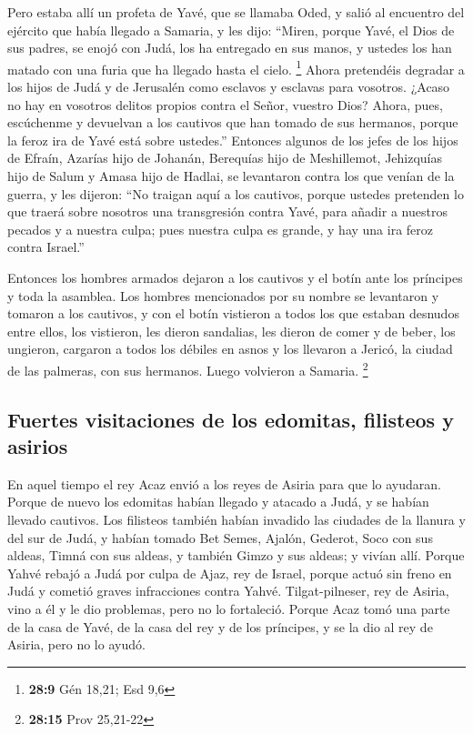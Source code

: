 \begin{paracol}{2}
 Pero estaba allí un profeta de Yavé, que se llamaba Oded,
y salió al encuentro del ejército que había llegado a Samaria, y les
dijo: ``Miren, porque Yavé, el Dios de sus padres, se enojó con Judá,
los ha entregado en sus manos, y ustedes los han matado con una furia
que ha llegado hasta el cielo. \footnote{\textbf{28:9} Gén 18,21; Esd
  9,6}  Ahora pretendéis degradar a los hijos de Judá y
de Jerusalén como esclavos y esclavas para vosotros. ¿Acaso no hay en
vosotros delitos propios contra el Señor, vuestro Dios? 
Ahora, pues, escúchenme y devuelvan a los cautivos que han tomado de sus
hermanos, porque la feroz ira de Yavé está sobre ustedes.''
 Entonces algunos de los jefes de los hijos de Efraín,
Azarías hijo de Johanán, Berequías hijo de Meshillemot, Jehizquías hijo
de Salum y Amasa hijo de Hadlai, se levantaron contra los que venían de
la guerra,  y les dijeron: ``No traigan aquí a los
cautivos, porque ustedes pretenden lo que traerá sobre nosotros una
transgresión contra Yavé, para añadir a nuestros pecados y a nuestra
culpa; pues nuestra culpa es grande, y hay una ira feroz contra
Israel.''

 Entonces los hombres armados dejaron a los cautivos y el
botín ante los príncipes y toda la asamblea.  Los hombres
mencionados por su nombre se levantaron y tomaron a los cautivos, y con
el botín vistieron a todos los que estaban desnudos entre ellos, los
vistieron, les dieron sandalias, les dieron de comer y de beber, los
ungieron, cargaron a todos los débiles en asnos y los llevaron a Jericó,
la ciudad de las palmeras, con sus hermanos. Luego volvieron a Samaria.
\footnote{\textbf{28:15} Prov 25,21-22}

\hypertarget{fuertes-visitaciones-de-los-edomitas-filisteos-y-asirios}{%
\subsection{Fuertes visitaciones de los edomitas, filisteos y
asirios}\label{fuertes-visitaciones-de-los-edomitas-filisteos-y-asirios}}

 En aquel tiempo el rey Acaz envió a los reyes de Asiria
para que lo ayudaran.  Porque de nuevo los edomitas
habían llegado y atacado a Judá, y se habían llevado cautivos.
 Los filisteos también habían invadido las ciudades de la
llanura y del sur de Judá, y habían tomado Bet Semes, Ajalón, Gederot,
Soco con sus aldeas, Timná con sus aldeas, y también Gimzo y sus aldeas;
y vivían allí.  Porque Yahvé rebajó a Judá por culpa de
Ajaz, rey de Israel, porque actuó sin freno en Judá y cometió graves
infracciones contra Yahvé.  Tilgat-pilneser, rey de
Asiria, vino a él y le dio problemas, pero no lo fortaleció.
 Porque Acaz tomó una parte de la casa de Yavé, de la
casa del rey y de los príncipes, y se la dio al rey de Asiria, pero no
lo ayudó.


\end{paracol}
